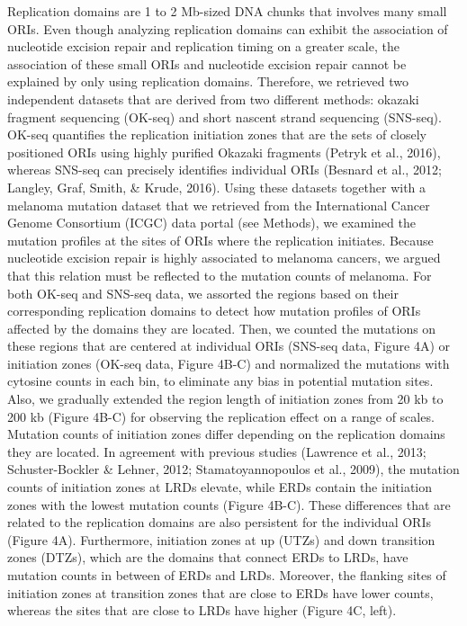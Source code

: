 Replication domains are 1 to 2 Mb-sized DNA chunks that involves many small ORIs. Even though analyzing replication domains can exhibit the association of nucleotide excision repair and replication timing on a greater scale, the association of these small ORIs and nucleotide excision repair cannot be explained by only using replication domains. Therefore, we retrieved two independent datasets that are derived from two different methods: okazaki fragment sequencing (OK-seq) and short nascent strand sequencing (SNS-seq). OK-seq quantifies the replication initiation zones that are the sets of closely positioned ORIs using highly purified Okazaki fragments (Petryk et al., 2016), whereas SNS-seq can precisely identifies individual ORIs (Besnard et al., 2012; Langley, Graf, Smith, \& Krude, 2016). Using these datasets together with a melanoma mutation dataset that we retrieved from the International Cancer Genome Consortium (ICGC) data portal (see Methods), we examined the mutation profiles at the sites of ORIs where the replication initiates. Because nucleotide excision repair is highly associated to melanoma cancers, we argued that this relation must be reflected to the mutation counts of melanoma. For both OK-seq and SNS-seq data, we assorted the regions based on their corresponding replication domains to detect how mutation profiles of ORIs affected by the domains they are located. Then, we counted the mutations on these regions that are centered at individual ORIs (SNS-seq data, Figure 4A) or initiation zones (OK-seq data, Figure 4B-C) and normalized the mutations with cytosine counts in each bin, to eliminate any bias in potential mutation sites. Also, we gradually extended the region length of initiation zones from 20 kb to 200 kb (Figure 4B-C) for observing the replication effect on a range of scales.
Mutation counts of initiation zones differ depending on the replication domains they are located. In agreement with previous studies (Lawrence et al., 2013; Schuster-Bockler \& Lehner, 2012; Stamatoyannopoulos et al., 2009), the mutation counts of initiation zones at LRDs elevate, while ERDs contain the initiation zones with the lowest mutation counts (Figure 4B-C). These differences that are related to the replication domains are also persistent for the individual ORIs (Figure 4A). Furthermore, initiation zones at up (UTZs) and down transition zones (DTZs), which are the domains that connect ERDs to LRDs, have mutation counts in between of ERDs and LRDs. Moreover, the flanking sites of initiation zones at transition zones that are close to ERDs have lower counts, whereas the sites that are close to LRDs have higher (Figure 4C, left). 
